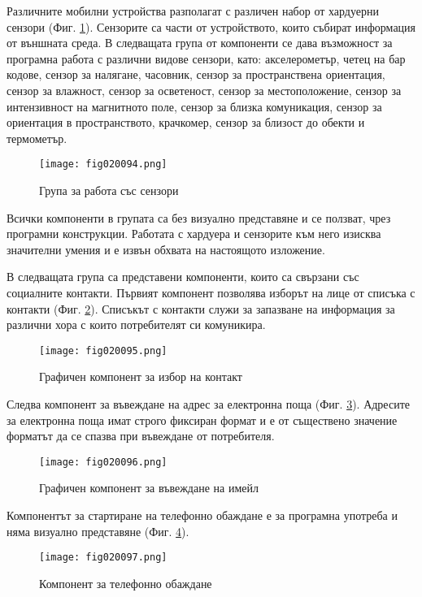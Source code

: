Различните мобилни устройства разполагат с различен набор от хардуерни сензори (Фиг. \ref{fig020094}). Сензорите са части от устройството, които събират информация от външната среда. В следващата група от компоненти се дава възможност за програмна работа с различни видове сензори, като: акселерометър, четец на бар кодове, сензор за налягане, часовник, сензор за пространствена ориентация, сензор за влажност, сензор за осветеност, сензор за местоположение, сензор за интензивност на магнитното поле, сензор за близка комуникация, сензор за ориентация в пространството, крачкомер, сензор за близост до обекти и термометър.

\begin{figure}[H]
  \centering
  \texttt{[image: fig020094.png]}
  \caption{Група за работа със сензори}
\label{fig020094}
\end{figure}

Всички компоненти в групата са без визуално представяне и се ползват, чрез програмни конструкции. Работата с хардуера и сензорите към него изисква значителни умения и е извън обхвата на настоящото изложение. 

В следващата група са представени компоненти, които са свързани със социалните контакти. Първият компонент позволява изборът на лице от списъка с контакти (Фиг. \ref{fig020095}). Списъкът с контакти служи за запазване на информация за различни хора с които потребителят си комуникира.

\begin{figure}[H]
  \centering
  \texttt{[image: fig020095.png]}
  \caption{Графичен компонент за избор на контакт}
\label{fig020095}
\end{figure}

Следва компонент за въвеждане на адрес за електронна поща (Фиг. \ref{fig020096}). Адресите за електронна поща имат строго фиксиран формат и е от съществено значение форматът да се спазва при въвеждане от потребителя. 

\begin{figure}[H]
  \centering
  \texttt{[image: fig020096.png]}
  \caption{Графичен компонент за въвеждане на имейл}
\label{fig020096}
\end{figure}

Компонентът за стартиране на телефонно обаждане е за програмна употреба и няма визуално представяне (Фиг. \ref{fig020097}).

\begin{figure}[H]
  \centering
  \texttt{[image: fig020097.png]}
  \caption{Компонент за телефонно обаждане}
\label{fig020097}
\end{figure}


